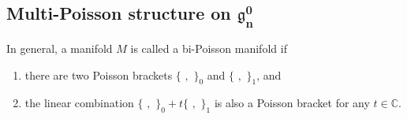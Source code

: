 \documentclass[pdftex]{sigma}
\numberwithin{equation}{section}
\begin{document}
\subsection[Multi-Poisson structure on $\mathfrak{g}^0_n$]{Multi-Poisson structure on $\boldsymbol{\mathfrak{g}^0_n}$}\label{section2.2}

In general, a manifold $M$ is called a bi-Poisson manifold if
\begin{enumerate}\itemsep=0pt
\item[(i)] there are two Poisson brackets $\{ \,\, , \,\, \}_0$ and $\{ \,\, , \,\, \}_1$, and
\item[(ii)] the linear combination $\{ \,\, , \,\, \}_0 + t \{ \,\,, \,\, \}_1$ is also a Poisson bracket for any $t\in \mathbb{C}$.
\end{enumerate}
\end{document}
